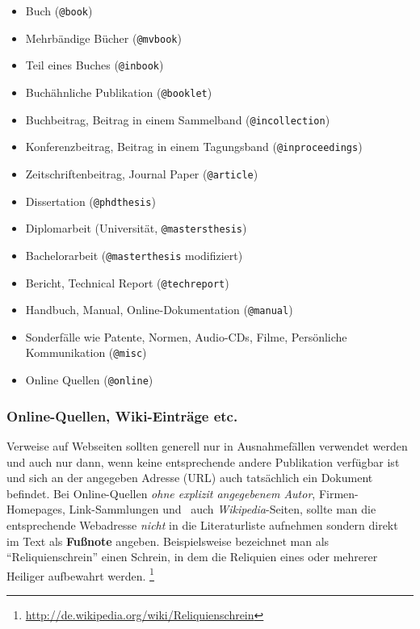 \begin{itemize}
\item Buch (\texttt{@book})\cite{BurgerBurge06}
\item Mehrbändige Bücher (\texttt{@mvbook})
\item Teil eines Buches (\texttt{@inbook})
\item Buchähnliche Publikation (\texttt{@booklet}) 
\item Buchbeitrag, Beitrag in einem Sammelband (\texttt{@incollection})\cite{Ears99}
\item Konferenzbeitrag, Beitrag in einem Tagungsband (\texttt{@inproceedings})\cite{Burger87}
\item Zeitschriftenbeitrag, Journal Paper (\texttt{@article})\cite{Guttman01}
\item Dissertation (\texttt{@phdthesis})\cite{Eberl87}
\item Diplomarbeit (Universität, \texttt{@mastersthesis})\cite{Wintersberger00}
\item Bachelorarbeit (\texttt{@masterthesis} modifiziert)\cite{Bacher04}
\item Bericht, Technical Report (\texttt{@techreport})\cite{Beeler48}
\item Handbuch, Manual, Online-Dokumentation (\texttt{@manual})\cite{Microsoft01}
\item Sonderfälle wie \zB Patente\cite{PAT07}, Normen\cite{DIN9241-11}\cite{DIN9241-110}, Audio-CDs\cite{Zappa95}, Filme\cite{Nosferatu}, Persönliche Kommunikation\cite{Kreisky75} (\texttt{@misc})
\item Online Quellen (\texttt{@online})
\end{itemize}

\subsubsection{Online-Quellen, Wiki-Einträge etc.}
\label{sec:OnlineQuellen}


Verweise auf Webseiten sollten generell nur in Ausnahmefällen
verwendet werden und auch nur dann, wenn keine entsprechende
andere Publikation verfügbar ist und sich an der angegeben Adresse
(URL) auch tatsächlich ein Dokument befindet. Bei Online-Quellen 
\emph{ohne explizit angegebenem Autor}, \zB Firmen-Homepages, 
Link-Sammlungen und \va\ auch \emph{Wikipedia}-Seiten, sollte 
man die entsprechende Webadresse \emph{nicht} in die
Literaturliste aufnehmen sondern direkt im Text als \textbf{Fußnote} 
angeben. Beispielsweise bezeichnet man als "`Reliquienschrein"' einen 
Schrein, in dem die Reliquien eines oder mehrerer Heiliger aufbewahrt werden.%
\footnote{\url{http://de.wikipedia.org/wiki/Reliquienschrein}}

